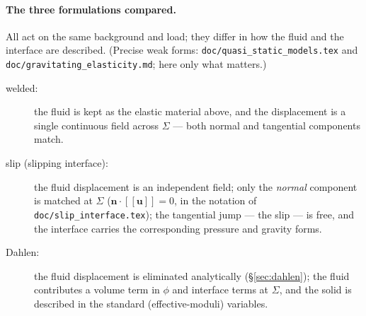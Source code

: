 \documentclass[11pt]{article}
\newcommand{\bu}{\mathbf{u}}
\newcommand{\bn}{\mathbf{n}}
\newcommand{\code}[1]{\texttt{#1}}
\newcommand{\jump}[1]{[\![#1]\!]}
\begin{document}
\paragraph{The three formulations compared.} All act on the same
background and load; they differ in how the fluid and the interface
are described. (Precise weak forms:
\code{doc/quasi\_static\_models.tex} and
\code{doc/gravitating\_elasticity.md}; here only what matters.)
\begin{description}
\item[welded:] the fluid is kept as the elastic material above, and
  the displacement is a single continuous field across $\Sigma$ ---
  both normal and tangential components match.
\item[slip (slipping interface):] the fluid displacement is an
  independent field; only the \emph{normal} component is matched at
  $\Sigma$ ($\bn\cdot\jump{\bu} = 0$, in the notation of
  \code{doc/slip\_interface.tex}); the tangential jump --- the slip
  --- is free, and the interface carries the corresponding pressure
  and gravity forms.
\item[Dahlen:] the fluid displacement is eliminated analytically
  (\S\ref{sec:dahlen}); the fluid contributes a volume term in $\phi$
  and interface terms at $\Sigma$, and the solid is described in the
  standard (effective-moduli) variables.
\end{description}
\end{document}
